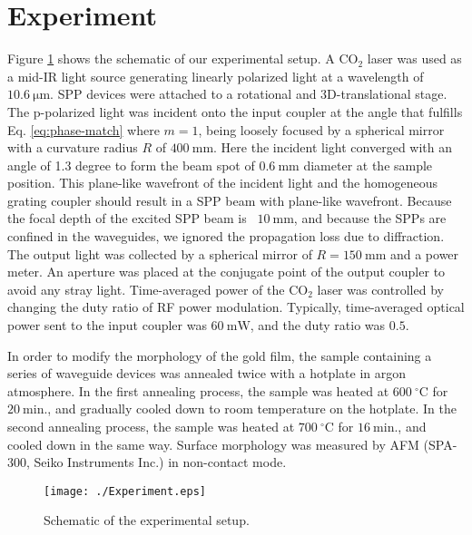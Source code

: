\documentclass[aip,apl,reprint]{revtex4-1}
\begin{document}
\section{Experiment}
\label{sec:experiment}
Figure \ref{fig:experiment} shows the schematic of our experimental setup. 
A $\mathrm{CO_2}$ laser was used as a mid-IR light source generating linearly polarized light at a wavelength of $10.6\:\mathrm{\mu m}$. 
SPP devices were attached to a rotational and 3D-translational stage. 
The p-polarized light was incident onto the input coupler at the angle that fulfills Eq. \ref{eq:phase-match} where $m=1$, being loosely focused by a spherical mirror with a curvature radius $R$ of $400\:\mathrm{mm}$. 
Here the incident light converged with an angle of 1.3 degree to form the beam spot of $0.6\:\mathrm{mm}$ diameter at the sample position. This plane-like wavefront of the incident light and the homogeneous grating coupler should result in a SPP beam with plane-like wavefront. Because the focal depth of the excited SPP beam is ~$10\:\mathrm{mm}$, and because the SPPs are confined in the waveguides, we ignored the propagation loss due to diffraction.
The output light was collected by a spherical mirror of $R=150\:\mathrm{mm}$ and a power meter. 
An aperture was placed at the conjugate point of the output coupler to avoid any stray light. 
Time-averaged power of the $\mathrm{CO_2}$ laser was controlled by changing the duty ratio of RF power modulation.
Typically, time-averaged optical power sent to the input coupler was $60\:\mathrm{mW}$, and the duty ratio was $0.5$. 

In order to modify the morphology of the gold film, the sample containing a series of waveguide devices was annealed twice with a hotplate in argon atmosphere\cite{Nogues}.
In the first annealing process, the sample was heated at $600\:^\circ\mathrm{C}$ for $20\:\mathrm{min}$., and gradually cooled down to room temperature on the hotplate. In the second annealing process, the sample was heated at $700\:^\circ\mathrm{C}$ for $16\:\mathrm{min}$., and cooled down in the same way. Surface morphology was measured by AFM (SPA-300, Seiko Instruments Inc.) in non-contact mode.


 \begin{figure}[htbp]
   \begin{center}
    \texttt{[image: ./Experiment.eps]}
    \caption{Schematic of the experimental setup.}
     \label{fig:experiment}
   \end{center}
\end{figure}
\end{document}
